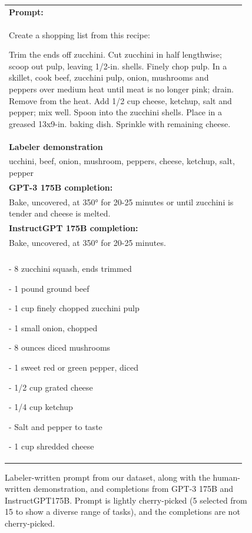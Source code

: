 \documentclass{article}
\begin{document}
\begin{figure}[hp]
    \centering
    \small
    \begin{tabular}{p{0.95\linewidth}}
    \toprule 
        \textbf{Prompt:}   \\
       Create a shopping list from this recipe: 

Trim the ends off zucchini. Cut zucchini in half lengthwise; scoop out pulp, leaving 1/2-in. shells. Finely chop pulp.
In a skillet, cook beef, zucchini pulp, onion, mushrooms and peppers over medium heat until meat is no longer pink; drain. Remove from the heat. Add 1/2 cup cheese, ketchup, salt and pepper; mix well. Spoon into the zucchini shells. Place in a greased 13x9-in. baking dish. Sprinkle with remaining cheese.

         \\ \midrule
\textbf{Labeler demonstration}\\ 
ucchini, beef, onion, mushroom, peppers, cheese, ketchup, salt, pepper
\\ \midrule 
        \textbf{GPT-3 175B completion:} \\
        Bake, uncovered, at 350° for 20-25 minutes or until zucchini is tender and cheese is melted.

\\ \midrule 
\textbf{InstructGPT 175B completion:} \\
 Bake, uncovered, at 350° for 20-25 minutes.

\\ \\

- 8 zucchini squash, ends trimmed

- 1 pound ground beef

- 1 cup finely chopped zucchini pulp

- 1 small onion, chopped

- 8 ounces diced mushrooms

- 1 sweet red or green pepper, diced

- 1/2 cup grated cheese

- 1/4 cup ketchup

- Salt and pepper to taste

- 1 cup shredded cheese
\\ \bottomrule
    \end{tabular}
    \caption{Labeler-written prompt from our dataset, along with the human-written demonstration, and completions from GPT-3 175B and InstructGPT175B. Prompt is lightly cherry-picked (5 selected from 15 to show a diverse range of tasks), and the completions are not cherry-picked.}
    \label{fig:qual_labeler_4}
\end{figure}
\end{document}
